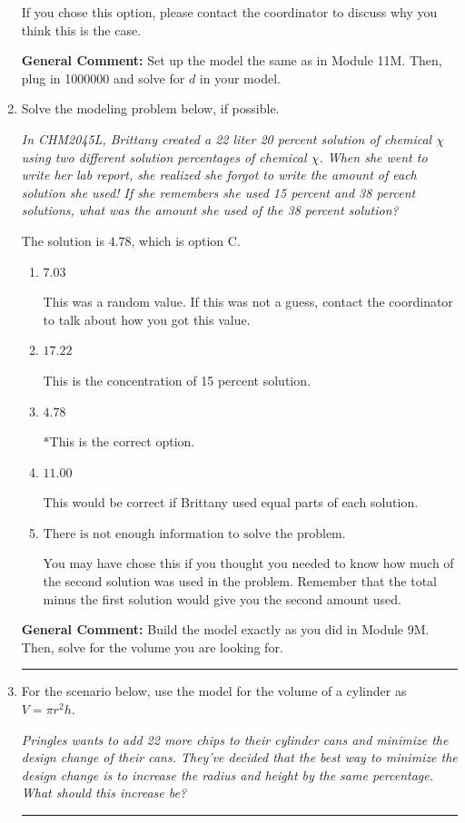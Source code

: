 \documentclass{extbook}[14pt]
\newcommand{\litem}[1]{\item #1

\rule{\textwidth}{0.4pt}}
\begin{document}
\begin{enumerate}
{\begin{enumerate}[label=\Alph*.]
If you chose this option, please contact the coordinator to discuss why you think this is the case.
\end{enumerate}

\textbf{General Comment:} Set up the model the same as in Module 11M. Then, plug in 1000000 and solve for $d$ in your model.
}
\litem{
Solve the modeling problem below, if possible.

\begin{center}
    \textit{ In CHM2045L, Brittany created a 22 liter 20 percent solution of chemical $\chi$ using two different solution percentages of chemical $\chi$. When she went to write her lab report, she realized she forgot to write the amount of each solution she used! If she remembers she used 15 percent and 38 percent solutions, what was the amount she used of the 38 percent solution? }
\end{center}


The solution is \( 4.78 \), which is option C.\begin{enumerate}[label=\Alph*.]
\item \( 7.03 \)

This was a random value. If this was not a guess, contact the coordinator to talk about how you got this value.
\item \( 17.22 \)

This is the concentration of 15 percent solution.
\item \( 4.78 \)

*This is the correct option.
\item \( 11.00 \)

This would be correct if Brittany used equal parts of each solution.
\item \( \text{There is not enough information to solve the problem.} \)

You may have chose this if you thought you needed to know how much of the second solution was used in the problem. Remember that the total minus the first solution would give you the second amount used.
\end{enumerate}

\textbf{General Comment:} Build the model exactly as you did in Module 9M. Then, solve for the volume you are looking for.
}
\litem{
For the scenario below, use the model for the volume of a cylinder as $V = \pi r^2 h$.

\begin{center}
    \textit{ Pringles wants to add 22 \text{percent} more chips to their cylinder cans and minimize the design change of their cans. They've decided that the best way to minimize the design change is to increase the radius and height by the same percentage. What should this increase be? }
\end{center}


}
\end{enumerate}
\end{document}
